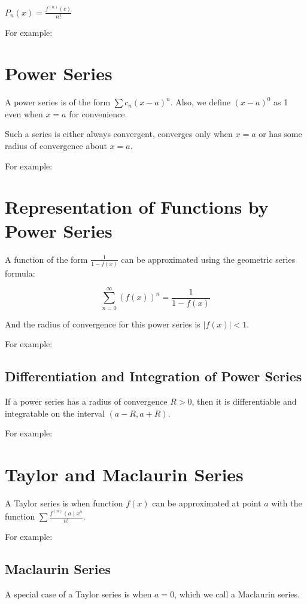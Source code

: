 \documentclass{article}
\begin{document}
$P_n(x) = \frac{f^{(n)}(c)}{n!}$

For example:

\section{Power Series}

A power series is of the form $\sum c_n(x-a)^n$.  Also, we define
$(x-a)^0$ as 1 even when $x=a$ for convenience.

Such a series is either always convergent, converges only when $x=a$
or has some radius of convergence about $x=a$.

For example:

\section{Representation of Functions by Power Series}

A function of the form $\frac{1}{1-f(x)}$ can be approximated using
the geometric series formula:

\[
\sum_{n=0}^\infty (f(x))^n = \frac{1}{1-f(x)}
\]

And the radius of convergence for this power series is $\left| f(x) \right| < 1$.

For example:

\subsection{Differentiation and Integration of Power Series}

If a power series has a radius of convergence $R > 0$, then it is
differentiable and integratable on the interval $(a-R,a+R)$.

For example:

\section{Taylor and Maclaurin Series}

A Taylor series is when function $f(x)$ can be approximated at point
$a$ with the function $\sum \frac{f^{(n)}(a)x^n}{n!}$.

For example:

\subsection{Maclaurin Series}

A special case of a Taylor series is when $a=0$, which we call a Maclaurin series.
\end{document}
